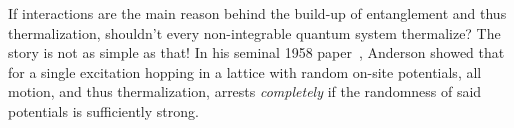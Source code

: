 
If interactions are the main reason behind the build-up of entanglement and thus thermalization, shouldn't every non-integrable quantum system thermalize? The story is not as simple as that! 
In his seminal 1958 paper~\cite{andersonAbsenceDiffusionCertain1958}, Anderson showed that for a single excitation hopping in a lattice with random on-site potentials, all motion, and thus thermalization, arrests \emph{completely} if the randomness of said potentials is sufficiently strong.
